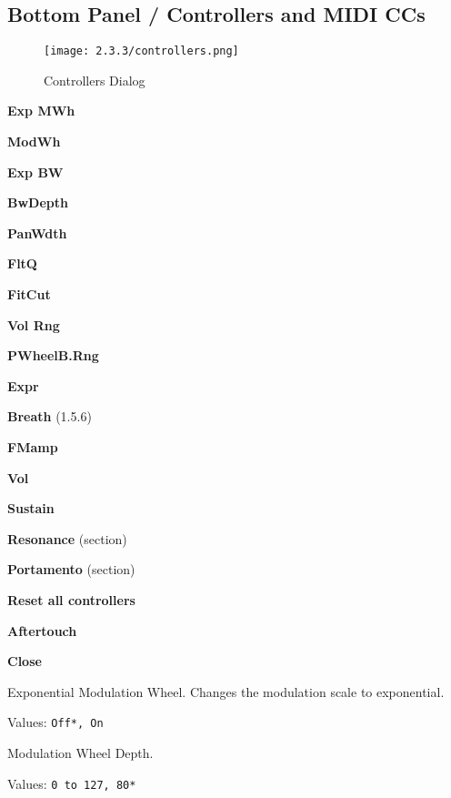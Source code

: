 \subsection{Bottom Panel / Controllers and MIDI CCs}
\label{subsec:bottom_panel_controllers}

\begin{figure}[H]
   \centering
   \texttt{[image: 2.3.3/controllers.png]}
   \caption{Controllers Dialog}
   \label{fig:controllers_dialog}
\end{figure}

   \begin{enumber}
      \item \textbf{Exp MWh}
      \item \textbf{ModWh}
      \item \textbf{Exp BW}
      \item \textbf{BwDepth}
      \item \textbf{PanWdth}
      \item \textbf{FltQ}
      \item \textbf{FitCut}
      \item \textbf{Vol Rng}
      \item \textbf{PWheelB.Rng}
      \item \textbf{Expr}
      \item \textbf{Breath} (1.5.6)
      \item \textbf{FMamp}
      \item \textbf{Vol}
      \item \textbf{Sustain}
      \item \textbf{Resonance} (section)
      \item \textbf{Portamento} (section)
      \item \textbf{Reset all controllers}
      \item \textbf{Aftertouch}
      \item \textbf{Close}
   \end{enumber}

   \setcounter{ItemCounter}{0}      %

   Exponential Modulation Wheel.
   Changes the modulation scale to exponential.

   Values: \texttt{Off*, On}

   Modulation Wheel Depth.

   Values: \texttt{0 to 127, 80*}

